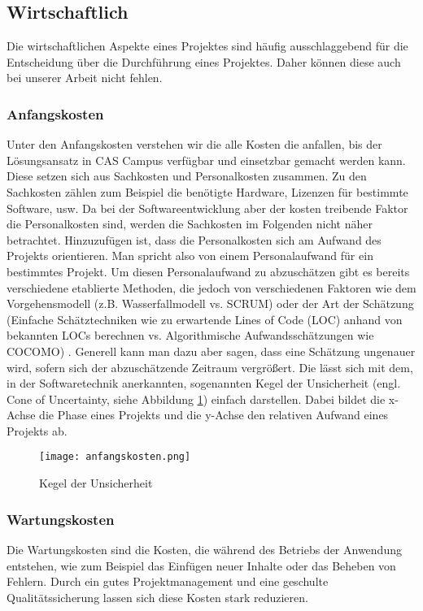 \subsection{Wirtschaftlich}
Die wirtschaftlichen Aspekte eines Projektes sind häufig ausschlaggebend für die Entscheidung über die Durchführung eines Projektes. Daher können diese auch bei unserer Arbeit nicht fehlen.
\subsubsection{Anfangskosten}
Unter den Anfangskosten verstehen wir die alle Kosten die anfallen, bis der Lösungsansatz in CAS Campus verfügbar und einsetzbar gemacht werden kann. Diese setzen sich aus Sachkosten und Personalkosten zusammen. Zu den Sachkosten zählen zum Beispiel die benötigte Hardware, Lizenzen für bestimmte Software, usw. Da bei der Softwareentwicklung aber der kosten treibende Faktor die Personalkosten sind, werden die Sachkosten im Folgenden nicht näher betrachtet. Hinzuzufügen ist, dass die Personalkosten sich am Aufwand des Projekts orientieren. Man spricht also von einem Personalaufwand für ein bestimmtes Projekt. Um diesen Personalaufwand zu abzuschätzen gibt es bereits verschiedene etablierte Methoden, die jedoch von verschiedenen Faktoren wie dem Vorgehensmodell (z.B. Wasserfallmodell vs. SCRUM) \cite{vorgehensmodelle} oder der Art der Schätzung (Einfache Schätztechniken wie zu erwartende Lines of Code (LOC) anhand von bekannten LOCs berechnen vs. Algorithmische Aufwandsschätzungen wie COCOMO) \cite{aufwand}. Generell kann man dazu aber sagen, dass eine Schätzung ungenauer wird, sofern sich der abzuschätzende Zeitraum vergrößert. Die lässt sich mit dem, in der Softwaretechnik anerkannten, sogenannten  Kegel der Unsicherheit (engl.  Cone of Uncertainty, siehe Abbildung \ref{img2:costs}) einfach darstellen. Dabei bildet die x-Achse die Phase eines Projekts und die y-Achse den relativen Aufwand eines Projekts ab.
\begin{figure}[ht]
\begin{center}
\texttt{[image: anfangskosten.png]}
\caption{Kegel der Unsicherheit }
\label{img2:costs}
\end{center}
\end{figure} 
\subsubsection{Wartungskosten}
Die Wartungskosten sind die Kosten, die während des Betriebs der Anwendung entstehen, wie zum Beispiel das Einfügen neuer Inhalte oder das Beheben von Fehlern. Durch ein gutes Projektmanagement und eine geschulte Qualitätssicherung lassen sich diese Kosten stark reduzieren.
